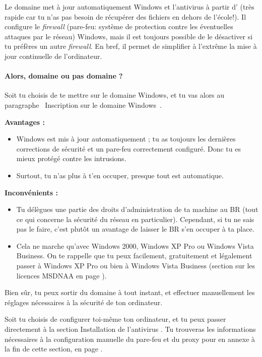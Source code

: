 Le domaine met \`a jour automatiquement Windows et l'antivirus \`a partir d' (tr\`es rapide car tu n'as pas besoin de r\'ecup\'erer des fichiers
en dehors de l'\'ecole!). Il configure le \emph{firewall} (pare-feu: syst\`eme de protection contre les \'eventuelles attaques par le r\'eseau) Windows, mais
il est toujours possible de le d\'esactiver si tu pr\'ef\`eres un autre \emph{firewall}. En bref, il permet de simplifier \`a l'extr\^eme la mise \`a jour
continuelle de l'ordinateur.


\paragraph{Alors, domaine ou pas domaine ?} Soit tu choisis de te
mettre sur le domaine Windows, et tu vas alors au paragraphe
\guillemotleft~Inscription sur le domaine Windows~\guillemotright.

\textbf{Avantages :}
\begin{itemize}
\item Windows est mis \`a jour automatiquement ; tu as toujours les
derni\`eres corrections de s\'ecurit\'e et un pare-feu correctement
configur\'e. Donc tu es mieux prot\'eg\'e contre les intrusions.
\item Surtout, tu n'as plus \`a t'en occuper, presque tout est automatique.
\end{itemize}

\textbf{Inconv\'enients :}
\begin{itemize}
  \item Tu d\'el\`egues une partie des droits d'administration de ta machine au BR
        (tout ce qui concerne la s\'ecurit\'e du r\'eseau en particulier).
        Cependant, si tu ne sais pas le faire, c'est plut\^ot un avantage
        de laisser le BR s'en occuper \`a ta place.
  \item Cela ne marche qu'avec Windows 2000, Windows XP Pro ou Windows Vista Business.
        On te rappelle que tu peux facilement, gratuitement et l\'egalement passer \`a
        Windows XP Pro ou bien \`a Windows Vista Business (section sur les licences
        MSDNAA en page \pageref{msdnaa}).
\end{itemize}

Bien s\^{u}r, tu peux sortir du domaine \`a tout instant, et effectuer manuellement les r\'eglages n\'ecessaires \`a la s\'ecurit\'e de ton ordinateur.

Soit tu choisis de configurer toi-m\^eme ton ordinateur, et tu peux passer
directement \`a la section \guillemotleft Installation de l'antivirus
\guillemotright. Tu trouveras les informations n\'ecessaires \`a la configuration
manuelle du pare-feu et du proxy pour  en annexe \`a la
fin de cette section, en page \pageref{horsdomaine}.

